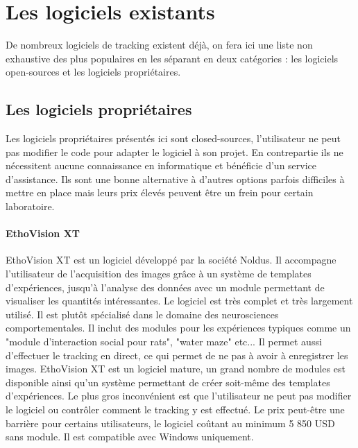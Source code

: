 	\section{Les logiciels existants}
  De nombreux logiciels de tracking existent déjà, on fera ici une liste non exhaustive des plus populaires en les séparant en deux catégories : les logiciels open-sources et les logiciels propriétaires.

  \subsection{Les logiciels propriétaires}
  Les logiciels propriétaires présentés ici sont closed-sources, l'utilisateur ne peut pas modifier le code pour adapter le logiciel à son projet. En contrepartie ils ne nécessitent aucune connaissance en informatique et bénéficie d'un service d'assistance. Ils sont une bonne alternative à d'autres options parfois difficiles à mettre en place mais leurs prix élevés peuvent être un frein pour certain laboratoire.
  
  \paragraph{EthoVision XT}
  EthoVision XT est un logiciel développé par la société Noldus. Il accompagne l'utilisateur de l'acquisition des images grâce à un système de templates d'expériences, jusqu'à l'analyse des données avec un module permettant de visualiser les quantités intéressantes. Le logiciel est très complet et très largement utilisé. Il est plutôt spécialisé dans le domaine des neurosciences comportementales. Il inclut des modules pour les expériences typiques comme un "module d'interaction social pour rats", "water maze" etc... Il permet aussi d'effectuer le tracking en direct, ce qui permet de ne pas à avoir à enregistrer les images.
\medbreak
  EthoVision XT est un logiciel mature, un grand nombre de modules est disponible ainsi qu'un système permettant de créer soit-même des templates d'expériences. Le plus gros inconvénient est que l'utilisateur ne peut pas modifier le logiciel ou contrôler comment le tracking y est effectué. Le prix peut-être une barrière pour certains utilisateurs, le logiciel coûtant au minimum 5 850 USD sans module. Il est compatible avec Windows uniquement.
  

